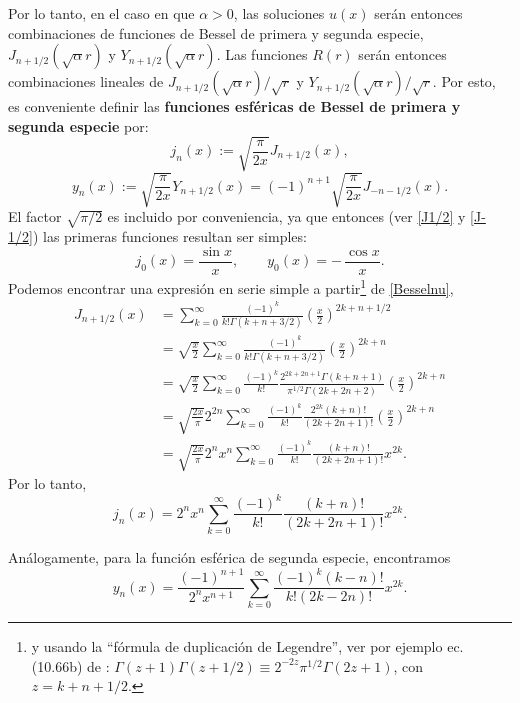 Por lo tanto, en el caso en que $\alpha>0$, las soluciones $u(x)$ serán entonces combinaciones de funciones de Bessel de primera y segunda especie, $J_{n+1/2}(\sqrt{\alpha}r)$ y $Y_{n+1/2}(\sqrt{\alpha}r)$. Las funciones $R(r)$ serán entonces combinaciones lineales de $J_{n+1/2}(\sqrt{\alpha}r)/\sqrt{r}$ y $Y_{n+1/2}(\sqrt{\alpha}r)/\sqrt{r}$. Por esto, es conveniente definir las \textbf{funciones esféricas de Bessel de primera y segunda especie} por:
\begin{equation}
j_{n}(x) := \sqrt{\frac{\pi}{2x}} J_{n+1/2}(x),
\end{equation}
\begin{equation}
y_{n}(x) := \sqrt{\frac{\pi}{2x}} Y_{n+1/2}(x) = (-1)^{n+1} \sqrt{\frac{\pi}{2x}} J_{-n-1/2}(x).
\end{equation}
El factor $\sqrt{\pi/2}$ es incluido por conveniencia, ya que entonces (ver \eqref{J1/2} y \eqref{J-1/2}) las primeras funciones resultan ser simples:
\begin{equation}\label{j0n0}
j_0(x) = \frac{\sin x}{x}, \qquad y_0(x)=-\,\frac{\cos x} {x}.
\end{equation}
Podemos encontrar una expresión en serie simple a partir\footnote{y usando la ``fórmula de duplicación de Legendre'', ver por ejemplo ec. (10.66b) de \cite{Arfken}: $\Gamma(z+1)\Gamma(z+1/2)\equiv 2^{-2z}\pi^{1/2}\Gamma(2z+1)$, con $z=k+n+1/2$.} de \eqref{Besselnu},
\begin{align}
J_{n+1/2} (x)&= \sum_{k = 0}^\infty \frac{ (-1)^k }{ k! \Gamma(k + n + 3/2) }
\left( \frac{x}{2} \right)^{2k+n+1/2} \\
&=\sqrt{\frac{x}{2}} \sum_{k=0}^\infty \frac{ (-1)^k }{ k! \Gamma(k + n + 3/2) }
\left( \frac{x}{2} \right)^{2k+n} \\
&=\sqrt{\frac{x}{2}} \sum_{k=0}^\infty \frac{ (-1)^k }{ k!}\frac{2^{2k+2n+1}\Gamma(k+n+1)}{\pi^{1/2}\Gamma(2k+2n+2)}
\left( \frac{x}{2} \right)^{2k+n} \\
&=\sqrt{\frac{2x}{\pi}} 2^{2n}\sum_{k=0}^\infty \frac{(-1)^k }{k!}\frac{2^{2k}(k+n)!}{(2k+2n+1)!}\left(\frac{x}{2}\right)^{2k+n} \\
&=\sqrt{\frac{2x}{\pi}} 2^n x^n\sum_{k=0}^\infty \frac{(-1)^k}{k!}\frac{(k+n)!}{(2k+2n+1)!}x^{2k} .
\end{align}
Por lo tanto,
\begin{equation}
\boxed{j_n(x)=2^n x^n\sum_{k=0}^\infty \frac{(-1)^k}{k!}\frac{(k+n)!}{(2k+2n+1)!}x^{2k} .}
\end{equation}

Análogamente, para la función esférica de segunda especie, encontramos
\begin{equation}
\boxed{y_n(x)=\frac{(-1)^{n+1}}{2^nx^{n+1}}\sum_{k=0}^\infty \frac{(-1)^k(k-n)!}{k!(2k-2n)!}x^{2k} .}
\end{equation}

